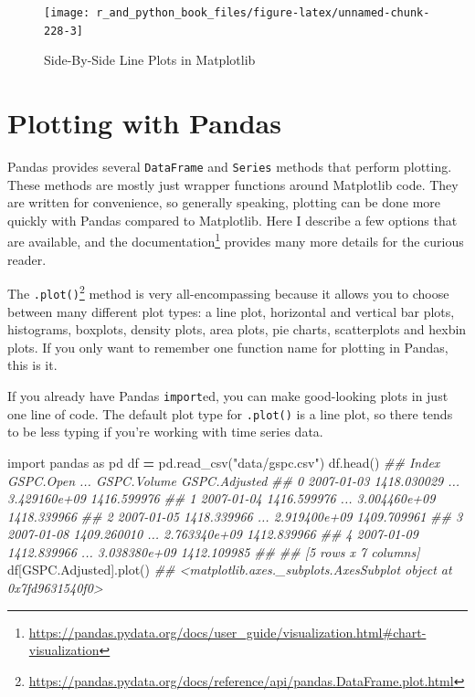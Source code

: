 \documentclass[
  12pt,
  krantz2]{krantz}
\makeatletter
\newenvironment{Shaded}{\begin{snugshade}}{\end{snugshade}}
\newcommand{\CommentTok}[1]{\textcolor[rgb]{0.37,0.37,0.37}{\textit{#1}}}
\newcommand{\ImportTok}[1]{#1}
\newcommand{\NormalTok}[1]{#1}
\newcommand{\OperatorTok}[1]{\textcolor[rgb]{0.43,0.43,0.43}{\textbf{#1}}}
\newcommand{\StringTok}[1]{\textcolor[rgb]{0.5,0.5,0.5}{#1}}
\renewcommand{\href}[2]{#2\footnote{\url{#1}}}
\newenvironment{kframe}{%
\medskip{}
\setlength{\fboxsep}{.8em}
 \def\at@end@of@kframe{}%
 \ifinner\ifhmode%
  \def\at@end@of@kframe{\end{minipage}}%
  \begin{minipage}{\columnwidth}%
 \fi\fi%
 \def\FrameCommand##1{\hskip\@totalleftmargin \hskip-\fboxsep
 \colorbox{shadecolor}{##1}\hskip-\fboxsep
     \hskip-\linewidth \hskip-\@totalleftmargin \hskip\columnwidth}%
 \MakeFramed {\advance\hsize-\width
   \@totalleftmargin\z@ \linewidth\hsize
   \@setminipage}}%
 {\par\unskip\endMakeFramed%
 \at@end@of@kframe}
\renewenvironment{Shaded}{\begin{kframe}}{\end{kframe}}
\makeatother
\begin{document}
\begin{figure}

{\centering \texttt{[image: r\_and\_python\_book\_files/figure-latex/unnamed-chunk-228-3]} 

}

\caption{Side-By-Side Line Plots in Matplotlib}\label{fig:unnamed-chunk-228}
\end{figure}

\hypertarget{plotting-with-pandas}{%
\section{Plotting with Pandas}\label{plotting-with-pandas}}

Pandas provides several \texttt{DataFrame} and \texttt{Series} methods that perform plotting. These methods are mostly just wrapper functions around Matplotlib code. They are written for convenience, so generally speaking, plotting can be done more quickly with Pandas compared to Matplotlib. Here I describe a few options that are available, and \href{https://pandas.pydata.org/docs/user_guide/visualization.html\#chart-visualization}{the documentation} provides many more details for the curious reader.

The \href{https://pandas.pydata.org/docs/reference/api/pandas.DataFrame.plot.html}{\texttt{.plot()}} method is very all-encompassing because it allows you to choose between many different plot types: a line plot, horizontal and vertical bar plots, histograms, boxplots, density plots, area plots, pie charts, scatterplots and hexbin plots. If you only want to remember one function name for plotting in Pandas, this is it.

If you already have Pandas \texttt{import}ed, you can make good-looking plots in just one line of code. The default plot type for \texttt{.plot()} is a line plot, so there tends to be less typing if you're working with time series data.

\begin{Shaded}
\begin{Highlighting}[]
\ImportTok{import}\NormalTok{ pandas }\ImportTok{as}\NormalTok{ pd}
\NormalTok{df }\OperatorTok{=}\NormalTok{ pd.read\_csv(}\StringTok{"data/gspc.csv"}\NormalTok{)}
\NormalTok{df.head()}
\CommentTok{\#\#         Index    GSPC.Open  ...   GSPC.Volume  GSPC.Adjusted}
\CommentTok{\#\# 0  2007{-}01{-}03  1418.030029  ...  3.429160e+09    1416.599976}
\CommentTok{\#\# 1  2007{-}01{-}04  1416.599976  ...  3.004460e+09    1418.339966}
\CommentTok{\#\# 2  2007{-}01{-}05  1418.339966  ...  2.919400e+09    1409.709961}
\CommentTok{\#\# 3  2007{-}01{-}08  1409.260010  ...  2.763340e+09    1412.839966}
\CommentTok{\#\# 4  2007{-}01{-}09  1412.839966  ...  3.038380e+09    1412.109985}
\CommentTok{\#\# }
\CommentTok{\#\# [5 rows x 7 columns]}
\NormalTok{df[}\StringTok{\textquotesingle{}GSPC.Adjusted\textquotesingle{}}\NormalTok{].plot()}
\CommentTok{\#\# \textless{}matplotlib.axes.\_subplots.AxesSubplot object at 0x7fd9631540f0\textgreater{}}
\end{Highlighting}
\end{Shaded}
\end{document}
